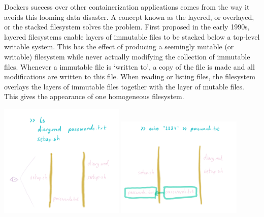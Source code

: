 \documentclass{csse4400}
\begin{document}
Dockers success over other containerization applications comes from the way it avoids this looming data disaster.
A concept known as the layered, or overlayed, or the stacked filesystem solves the problem.
First proposed in the early 1990s, layered filesystems enable layers of immutable files to be stacked below a top-level writable system.
This has the effect of producing a seemingly mutable (or writable) filesystem while never actually modifying the collection of immutable files.
Whenever a immutable file is `written to', a copy of the file is made and all modifications are written to this file.
When reading or listing files, the filesystem overlays the layers of immutable files together with the layer of mutable files.
This gives the appearance of one homogeneous filesystem.





    
\includegraphics[width=0.45\textwidth]{images/lfs-list}
\includegraphics[width=0.45\textwidth]{images/lfs-write}
\end{document}

